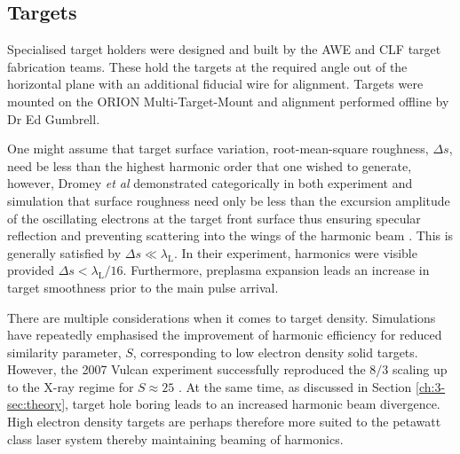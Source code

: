 


\subsection{Targets}
Specialised target holders were designed and built by the AWE and CLF target fabrication teams. These hold the targets at the required angle out of the horizontal plane with an additional fiducial wire for alignment. Targets were mounted on the ORION Multi-Target-Mount and alignment performed offline by Dr Ed Gumbrell.

One might assume that target surface variation, root-mean-square roughness, $\Delta s$, need be less than the highest harmonic order that one wished to generate, however, Dromey \textit{et al} demonstrated categorically in both experiment and simulation that surface roughness need only be less than the excursion amplitude of the oscillating electrons at the target front surface thus ensuring specular reflection and preventing scattering into the wings of the harmonic beam \cite{dromeyDiffractionlimitedPerformanceFocusing2009}. This is generally satisfied by $\Delta s \ll \lambda_\mathrm{L}$. In their experiment, harmonics were visible provided $\Delta s < \lambda_\mathrm{L}/16$. Furthermore, preplasma expansion leads an increase in target smoothness prior to the main pulse arrival.

There are multiple considerations when it comes to target density. Simulations have repeatedly emphasised the improvement of harmonic efficiency for reduced similarity parameter, $S$, \cite{gonoskovUltrarelativisticNanoplasmonicsRoute2011, edwardsXRayEmissionEffectiveness2020} corresponding to low electron density solid targets. However, the 2007 Vulcan experiment successfully reproduced the $8/3$ scaling up to the X-ray regime for $S \approx 25 $ \cite{dromeyBrightMultikeVHarmonic2007}. At the same time, as discussed in Section \ref{ch:3-sec:theory}, target hole boring leads to an increased harmonic beam divergence. High electron density targets are perhaps therefore more suited to the petawatt class laser system thereby maintaining beaming of harmonics.

